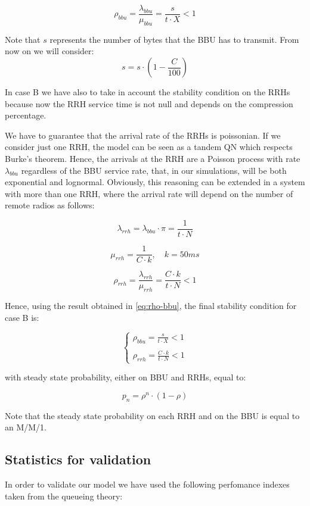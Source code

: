 \documentclass[11pt,a4paper,oneside, openright]{article}
\begin{document}
\begin{equation} \label{eq:rho-bbu}
\rho_{bbu} = \frac{\lambda_{bbu}}{\mu_{bbu}} = \frac{s}{t \cdot X} < 1
\end{equation}

Note that $s$ represents the number of bytes that the BBU has to transmit. From now on we will consider:
$$s = s\cdot(1-\frac{C}{100})$$

In case B we have also to take in account the stability condition on the RRHs because now the RRH service time is not null and depends on the compression percentage. 

We have to guarantee that the arrival rate of the RRHs is poissonian. If we consider just one RRH, the model can be seen as a tandem QN which respects Burke's theorem. Hence, the arrivals at the RRH are a Poisson process with rate $ \lambda_{bbu} $ regardless of the BBU service rate, that, in our simulations, will be both exponential and lognormal. 
Obviously, this reasoning can be extended in a system with more than one RRH, where the arrival rate will depend on the number of remote radios as follows:

$$ \lambda_{rrh} = \lambda_{bbu} \cdot \pi = \frac{1}{t \cdot N} $$

$$ \mu_{rrh} = \frac{1}{C \cdot k}, \quad k = 50ms $$

\begin{equation} \label{eq:rho-rrh}
\rho_{rrh} = \frac{\lambda_{rrh}}{\mu_{rrh}} = \frac{C \cdot k}{t \cdot N} < 1
\end{equation}

Hence, using the result obtained in \ref{eq:rho-bbu}, the final stability condition for case B is:

$$ \begin{cases} \rho_{bbu} = \frac{s}{t \cdot X} < 1 \\ \\ \rho_{rrh} = \frac{C \cdot k}{t \cdot N} < 1 \end{cases} $$

with steady state probability, either on BBU and RRHs, equal to:

$$ p_{n} = \rho^n \cdot (1 - \rho) $$

Note that the steady state probability on each RRH and on the BBU is equal to an M/M/1.

\subsection{Statistics for validation}
In order to validate our model we have used the following perfomance indexes taken from the queueing theory:
\end{document}
